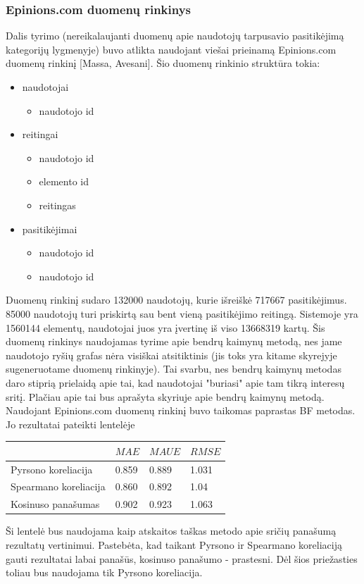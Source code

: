 \documentclass{VUMIFInfMagistrinis}
\begin{document}
\subsubsection{Epinions.com duomenų rinkinys}
Dalis tyrimo (nereikalaujanti duomenų apie naudotojų tarpusavio pasitikėjimą kategorijų lygmenyje) buvo atlikta naudojant viešai prieinamą Epinions.com duomenų rinkinį [Massa, Avesani]. Šio duomenų rinkinio struktūra tokia:
\begin{itemize}
	\item naudotojai
	\begin{itemize}
		\item naudotojo id
	\end{itemize}
	\item reitingai
	\begin{itemize}
		\item naudotojo id
		\item elemento id
		\item reitingas
	\end{itemize}
	\item pasitikėjimai
	\begin{itemize}
		\item naudotojo id
		\item naudotojo id
	\end{itemize}
\end{itemize}
\indent
Duomenų rinkinį sudaro 132000 naudotojų, kurie išreiškė 717667 pasitikėjimus. 85000 naudotojų turi priskirtą sau bent vieną pasitikėjimo reitingą. Sistemoje yra 1560144 elementų, naudotojai juos yra įvertinę iš viso 13668319 kartų.
\newline
\indent
Šis duomenų rinkinys naudojamas tyrime apie bendrų kaimynų metodą, nes jame naudotojo ryšių grafas nėra visiškai atsitiktinis (jis toks yra kitame skyrejyje sugeneruotame duomenų rinkinyje). Tai svarbu, nes bendrų kaimynų metodas daro stiprią prielaidą apie tai, kad naudotojai "buriasi" apie tam tikrą interesų sritį. Plačiau apie tai bus aprašyta skyriuje apie bendrų kaimynų metodą.
\newline
\indent
Naudojant Epinions.com duomenų rinkinį buvo taikomas paprastas BF metodas. Jo rezultatai pateikti lentelėje
\begin{center}
	\begin{tabular}{ | l | l | l | l |}
		\hline
		& $MAE$ & $MAUE$ & $RMSE$ \\ \hline
		Pyrsono koreliacija   & 0.859 & 0.889 & 1.031 \\ \hline
		Spearmano koreliacija & 0.860 & 0.892 & 1.04  \\ \hline
		Kosinuso panašumas    & 0.902 & 0.923 & 1.063  \\ \hline
		\hline
	\end{tabular}
\end{center}
Ši lentelė bus naudojama kaip atskaitos taškas metodo apie sričių panašumą rezultatų vertinimui.
\newline 
\indent
Pastebėta, kad taikant Pyrsono ir Spearmano koreliaciją gauti rezultatai labai panašūs, kosinuso panašumo - prastesni. Dėl šios priežasties toliau bus naudojama tik Pyrsono koreliacija.
\end{document}
